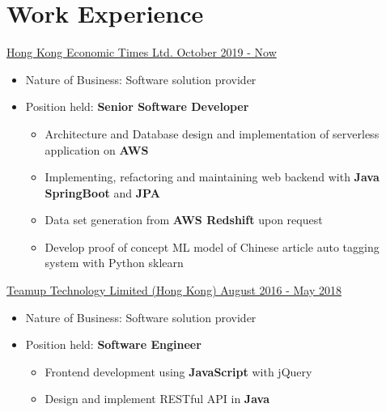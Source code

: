 \documentclass[a4paper,12pt]{article}
\begin{document}
  \title{}
  \author{\Large Ka Wing, PANG \\ Email: \href{mailto:pkwww.2000@gmail.com}{pkwww.2000@gmail.com} \\ GitHub: \href{https://github.com/pkwww}{https://github.com/pkwww}  \\ Phone: +852 65489919}%
  \date{}
  \maketitle

  \section*{Work Experience}
  \uline{Hong Kong Economic Times Ltd. \hfill October 2019 - Now}
  \begin{itemize}
    \item Nature of Business: Software solution provider
    \item Position held: \textbf{Senior Software Developer}
    \begin{itemize}
      \item Architecture and Database design and implementation of serverless application on \textbf{AWS}
      \item Implementing, refactoring and maintaining web backend with \textbf{Java SpringBoot} and \textbf{JPA}
      \item Data set generation from \textbf{AWS Redshift} upon request
      \item Develop proof of concept ML model of Chinese article auto tagging system with Python sklearn
    \end{itemize}
  \end{itemize}
  \uline{Teamup Technology Limited (Hong Kong) \hfill August 2016 - May 2018}
    \begin{itemize}
      \item Nature of Business: Software solution provider
      \item Position held: \textbf{Software Engineer}
      \begin{itemize}
        \item Frontend development using \textbf{JavaScript} with jQuery
        \item Design and implement RESTful API in \textbf{Java}
      \end{itemize}
    \end{itemize}
\end{document}
